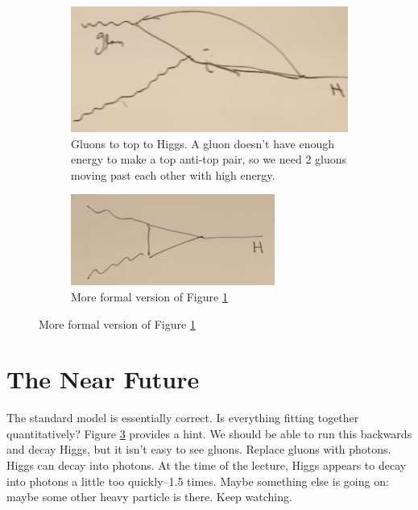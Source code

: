 \documentclass[]{article}
\begin{document}
\begin{figure}[H]
	\caption{How to make a Higgs}

	\begin{subfigure}[t]{0.45\textwidth}
		\caption{Gluons to top to Higgs. A gluon doesn't have enough energy to make a top anti-top pair, so we need 2 gluons moving past each other with high energy.}\label{fig:2-a3-gluons}
		\includegraphics[width=\textwidth]{2-a3-gluons}
	\end{subfigure}
	\begin{subfigure}[t]{0.45\textwidth}
		\caption{More formal version of Figure \ref{fig:2-a3-gluons} }\label{fig:2-a3-higgs-neat}
		\includegraphics[width=\textwidth]{2-a3-higgs-neat}
	\end{subfigure}
\end{figure}

\section{The Near Future}

The standard model is essentially correct. Is everything fitting together quantitatively? Figure \ref{fig:2-a3-higgs-neat} provides a hint. We should be able to run this backwards and decay Higgs, but it isn't easy to see gluons. Replace gluons with photons. Higgs can decay into photons. At the time of the lecture, Higgs appears to decay into photons a little too quickly--1.5 times. Maybe something else is going on: maybe some other heavy particle is there. Keep watching. 



\end{document}
